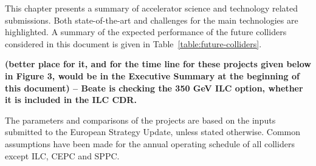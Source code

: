 
This chapter presents a summary of accelerator science and technology related submissions. Both state-of-the-art and challenges for the main technologies are highlighted. A summary of the expected performance of the future colliders considered in this document is given in Table~\ref{table:future-colliders}.

{\bf (better place for it, and for the time line for these projects given below in Figure 3, would be in the Executive Summary at the beginning of this document) -- Beate is checking the 350 GeV ILC option, whether it is included in the ILC CDR.}

The parameters and comparisons of the projects are based on the inputs submitted to the European Strategy Update, unless stated otherwise. Common assumptions have been made \cite{Bordry:2018gri} for the annual operating schedule of all colliders except ILC, CEPC and SPPC.

